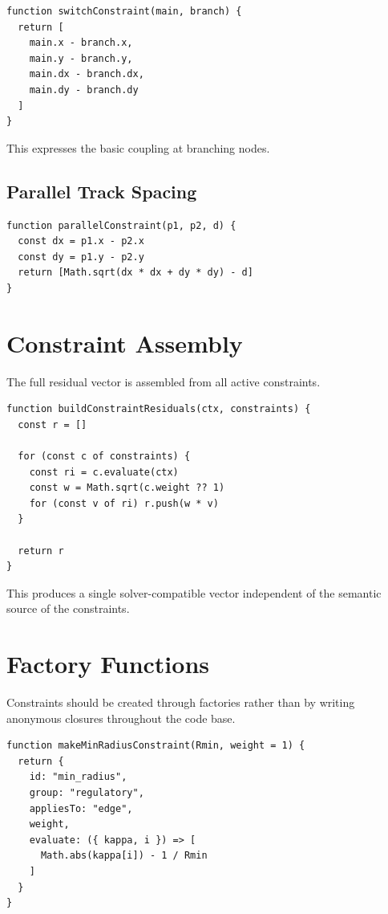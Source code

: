 \begin{verbatim}
function switchConstraint(main, branch) {
  return [
    main.x - branch.x,
    main.y - branch.y,
    main.dx - branch.dx,
    main.dy - branch.dy
  ]
}
\end{verbatim}

This expresses the basic coupling at branching nodes.

\subsection{Parallel Track Spacing}

\begin{verbatim}
function parallelConstraint(p1, p2, d) {
  const dx = p1.x - p2.x
  const dy = p1.y - p2.y
  return [Math.sqrt(dx * dx + dy * dy) - d]
}
\end{verbatim}

\section{Constraint Assembly}

The full residual vector is assembled from all active constraints.

\begin{verbatim}
function buildConstraintResiduals(ctx, constraints) {
  const r = []

  for (const c of constraints) {
    const ri = c.evaluate(ctx)
    const w = Math.sqrt(c.weight ?? 1)
    for (const v of ri) r.push(w * v)
  }

  return r
}
\end{verbatim}

This produces a single solver-compatible vector independent of the
semantic source of the constraints.

\section{Factory Functions}

Constraints should be created through factories rather than by writing
anonymous closures throughout the code base.

\begin{verbatim}
function makeMinRadiusConstraint(Rmin, weight = 1) {
  return {
    id: "min_radius",
    group: "regulatory",
    appliesTo: "edge",
    weight,
    evaluate: ({ kappa, i }) => [
      Math.abs(kappa[i]) - 1 / Rmin
    ]
  }
}
\end{verbatim}

